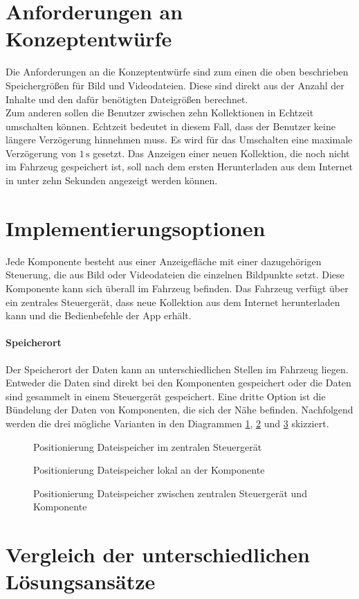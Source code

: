 \section{Anforderungen an Konzeptentwürfe}
Die Anforderungen an die Konzeptentwürfe sind zum einen die oben beschrieben Speichergrößen für Bild und Videodateien. Diese sind direkt aus der Anzahl der Inhalte und den dafür benötigten Dateigrößen berechnet. \\
Zum anderen sollen die Benutzer zwischen zehn Kollektionen in Echtzeit umschalten können. Echtzeit bedeutet in diesem Fall, dass der Benutzer keine längere Verzögerung hinnehmen muss. Es wird für das Umschalten eine maximale Verzögerung von $ 1\,\mathrm{s} $ gesetzt.
Das Anzeigen einer neuen Kollektion, die noch nicht im Fahrzeug gespeichert ist, soll nach dem ersten Herunterladen aus dem Internet in unter zehn Sekunden angezeigt werden können.
\section{Implementierungsoptionen}
Jede Komponente besteht aus einer Anzeigefläche mit einer dazugehörigen Steuerung, die aus Bild oder Videodateien die einzelnen Bildpunkte setzt. Diese Komponente kann sich überall im Fahrzeug befinden.
Das Fahrzeug verfügt über ein zentrales Steuergerät, dass neue Kollektion aus dem Internet herunterladen kann und die Bedienbefehle der App erhält.
\paragraph{Speicherort}
Der Speicherort der Daten kann an unterschiedlichen Stellen im Fahrzeug liegen. Entweder die Daten sind direkt bei den Komponenten gespeichert oder die Daten sind gesammelt in einem Steuergerät gespeichert. Eine dritte Option ist die Bündelung der Daten von Komponenten, die sich der Nähe befinden.
Nachfolgend werden die drei mögliche Varianten in den Diagrammen \ref{fig:architektur1}, \ref{fig:architektur2}  und \ref{fig:architektur3} skizziert.
\begin{figure}[hbt]
	\centering
	
	\caption[Positionierung Dateispeicher im zentralen Steuergerät]{Positionierung Dateispeicher im zentralen Steuergerät}
	\label{fig:architektur1}
\end{figure}
\begin{figure}[hbt]
	\centering
	
	\caption[Positionierung Dateispeicher lokal an der Komponente]{Positionierung Dateispeicher lokal an der Komponente}
	\label{fig:architektur2}
\end{figure}
\begin{figure}[hbt]
	\centering
	
	\caption[Positionierung Dateispeicher zwischen zentralen Steuergerät und Komponente]{Positionierung Dateispeicher zwischen zentralen Steuergerät und Komponente}
	\label{fig:architektur3}
\end{figure}

\section{Vergleich der unterschiedlichen Lösungsansätze}